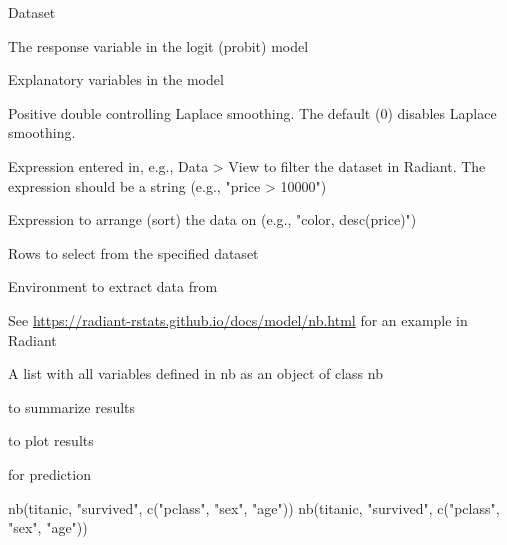 \documentclass[a4paper]{book}
\begin{document}
%
\begin{Arguments}
\begin{ldescription}
\item[\code{dataset}] Dataset

\item[\code{rvar}] The response variable in the logit (probit) model

\item[\code{evar}] Explanatory variables in the model

\item[\code{laplace}] Positive double controlling Laplace smoothing. The default (0) disables Laplace smoothing.

\item[\code{data\_filter}] Expression entered in, e.g., Data > View to filter the dataset in Radiant. The expression should be a string (e.g., "price > 10000")

\item[\code{arr}] Expression to arrange (sort) the data on (e.g., "color, desc(price)")

\item[\code{rows}] Rows to select from the specified dataset

\item[\code{envir}] Environment to extract data from
\end{ldescription}
\end{Arguments}
%
\begin{Details}
See \url{https://radiant-rstats.github.io/docs/model/nb.html} for an example in Radiant
\end{Details}
%
\begin{Value}
A list with all variables defined in nb as an object of class nb
\end{Value}
%
\begin{SeeAlso}
 to summarize results

 to plot results

 for prediction
\end{SeeAlso}
%
\begin{Examples}
\begin{ExampleCode}
nb(titanic, "survived", c("pclass", "sex", "age")) %
nb(titanic, "survived", c("pclass", "sex", "age")) %

\end{ExampleCode}
\end{Examples}
\end{document}
